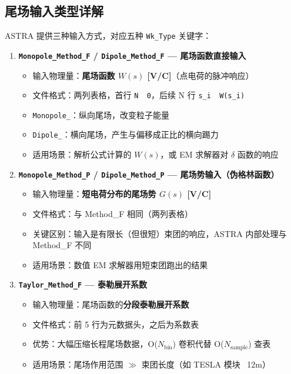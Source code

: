 \documentclass[a4paper,11pt]{article}
\begin{document}
\subsection{尾场输入类型详解}

ASTRA 提供三种输入方式，对应五种 \texttt{Wk\_Type} 关键字：

\begin{enumerate}[label=\textbf{方法 \arabic*:}, leftmargin=*]

  \item \textbf{\texttt{Monopole\_Method\_F} / \texttt{Dipole\_Method\_F} — 尾场函数直接输入}

  \begin{itemize}
    \item 输入物理量：\textbf{尾场函数 $W(s)$ [V/C]}（点电荷的脉冲响应）
    \item 文件格式：两列表格，首行 \texttt{N\ \ 0}，后续 N 行 \texttt{s\_i\ \ W(s\_i)}
    \item \texttt{Monopole\_}：纵向尾场，改变粒子能量
    \item \texttt{Dipole\_}：横向尾场，产生与偏移成正比的横向踢力
    \item 适用场景：解析公式计算的 $W(s)$，或 EM 求解器对 $\delta$ 函数的响应
  \end{itemize}

  \item \textbf{\texttt{Monopole\_Method\_P} / \texttt{Dipole\_Method\_P} — 尾场势输入（伪格林函数）}

  \begin{itemize}
    \item 输入物理量：\textbf{短电荷分布的尾场势 $G(s)$ [V/C]}
    \item 文件格式：与 Method\_F 相同（两列表格）
    \item 关键区别：输入是有限长（但很短）束团的响应，ASTRA 内部处理与 Method\_F 不同
    \item 适用场景：数值 EM 求解器用短束团跑出的结果
  \end{itemize}

  \item \textbf{\texttt{Taylor\_Method\_F} — 泰勒展开系数}

  \begin{itemize}
    \item 输入物理量：尾场函数的\textbf{分段泰勒展开系数}
    \item 文件格式：前 5 行为元数据头，之后为系数表
    \item 优势：大幅压缩长程尾场数据，O($N_{\text{bin}}$) 卷积代替 O($N_{\text{sample}}$) 查表
    \item 适用场景：尾场作用范围 $\gg$ 束团长度（如 TESLA 模块 ~12m）
  \end{itemize}

\end{enumerate}
\end{document}
